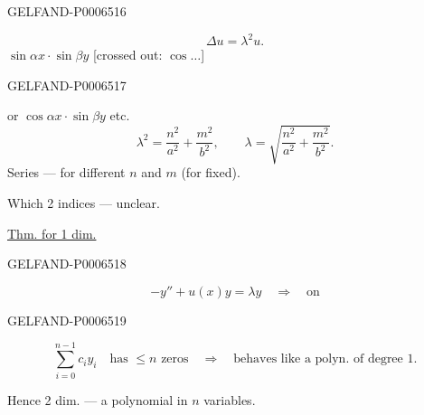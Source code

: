 \begin{GelfandAdjacentEvidence}{GELFAND-P000651}{6}

\[
\Delta u=\lambda^2u.
\]
\(\sin\alpha x\cdot\sin\beta y\)
[crossed out: \(\cos\ldots\)]
\end{GelfandAdjacentEvidence}
\begin{GelfandAdjacentEvidence}{GELFAND-P000651}{7}

or \(\cos\alpha x\cdot\sin\beta y\) etc.
\[
\lambda^2=\frac{n^2}{a^2}+\frac{m^2}{b^2},\qquad
\lambda=\sqrt{\frac{n^2}{a^2}+\frac{m^2}{b^2}}.
\]
Series --- for different \(n\) and \(m\) (for fixed).

Which 2 indices --- unclear.

\underline{Thm. for 1 dim.}
\end{GelfandAdjacentEvidence}
\begin{GelfandAdjacentEvidence}{GELFAND-P000651}{8}

\[
-y''+u(x)y=\lambda y\quad\Longrightarrow\quad\text{on}
\]
\end{GelfandAdjacentEvidence}
\begin{GelfandAdjacentEvidence}{GELFAND-P000651}{9}

\[
\sum_{i=0}^{n-1}c_i y_i\quad\text{has \(\leq n\) zeros}
\quad\Longrightarrow\quad\text{behaves like a polyn. of degree 1.}
\]

Hence 2 dim. --- a polynomial in \(n\) variables.
\end{GelfandAdjacentEvidence}
